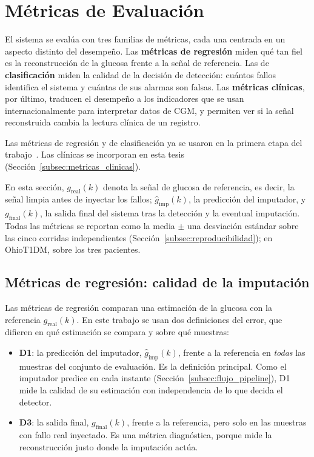 \documentclass{report}
\begin{document}
\section{Métricas de Evaluación}
\label{sec:metricas}

El sistema se evalúa con tres familias de métricas, cada una centrada en un aspecto distinto del desempeño. Las \textbf{métricas de regresión} miden qué tan fiel es la reconstrucción de la glucosa frente a la señal de referencia. Las de \textbf{clasificación} miden la calidad de la decisión de detección: cuántos fallos identifica el sistema y cuántas de sus alarmas son falsas. Las \textbf{métricas clínicas}, por último, traducen el desempeño a los indicadores que se usan internacionalmente para interpretar datos de CGM, y permiten ver si la señal reconstruida cambia la lectura clínica de un registro.

Las métricas de regresión y de clasificación ya se usaron en la primera etapa del trabajo~\cite{sanchez2025imputation}. Las clínicas se incorporan en esta tesis (Sección~\ref{subsec:metricas_clinicas}).

En esta sección, $g_{\mathrm{real}}(k)$ denota la señal de glucosa de referencia, es decir, la señal limpia antes de inyectar los fallos; $\hat{g}_{\mathrm{imp}}(k)$, la predicción del imputador, y $g_{\mathrm{final}}(k)$, la salida final del sistema tras la detección y la eventual imputación. Todas las métricas se reportan como la media $\pm$ una desviación estándar sobre las cinco corridas independientes (Sección~\ref{subsec:reproducibilidad}); en OhioT1DM, sobre los tres pacientes.

\subsection{Métricas de regresión: calidad de la imputación}
\label{subsec:metricas_regresion}

Las métricas de regresión comparan una estimación de la glucosa con la referencia $g_{\mathrm{real}}(k)$. En este trabajo se usan dos definiciones del error, que difieren en qué estimación se compara y sobre qué muestras:

\begin{itemize}
    \item \textbf{D1}: la predicción del imputador, $\hat{g}_{\mathrm{imp}}(k)$, frente a la referencia en \emph{todas} las muestras del conjunto de evaluación. Es la definición principal. Como el imputador predice en cada instante (Sección~\ref{subsec:flujo_pipeline}), D1 mide la calidad de su estimación con independencia de lo que decida el detector.
    \item \textbf{D3}: la salida final, $g_{\mathrm{final}}(k)$, frente a la referencia, pero solo en las muestras con fallo real inyectado. Es una métrica diagnóstica, porque mide la reconstrucción justo donde la imputación actúa.
\end{itemize}
\end{document}
